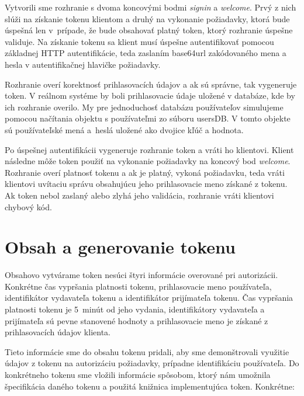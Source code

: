Vytvorili sme rozhranie s dvoma koncovými bodmi \textit{signin} a \textit{welcome}. Prvý z nich slúži na získanie tokenu klientom a druhý na vykonanie požiadavky, ktorá bude úspešná len v~prípade, že bude obsahovať platný token, ktorý rozhranie úspešne validuje. Na získanie tokenu sa klient musí úspešne autentifikovať pomocou základnej HTTP autentifikácie, teda zaslaním base64url \cite{base64_rfc} zakódovaného mena a hesla v autentifikačnej hlavičke požiadavky.

Rozhranie overí korektnosť prihlasovacích údajov a ak sú správne, tak vygeneruje token. V reálnom systéme by boli prihlasovacie údaje uložené v databáze, kde by ich rozhranie overilo. My pre jednoduchosť databázu používateľov simulujeme pomocou načítania objektu s používateľmi zo súboru usersDB. V tomto objekte sú používateľské mená a~heslá uložené ako dvojice kľúč a hodnota.

Po úspešnej autentifikácii vygeneruje rozhranie token a vráti ho klientovi. Klient následne môže token použiť na vykonanie požiadavky na koncový bod \textit{welcome}. Rozhranie overí platnosť tokenu a ak je platný, vykoná požiadavku, teda vráti klientovi uvítaciu správu obsahujúcu jeho prihlasovacie meno získané z tokenu. Ak token nebol zaslaný alebo zlyhá jeho validácia, rozhranie vráti klientovi chybový kód.

\section{Obsah a generovanie tokenu}
\label{sec:obsah}

Obsahovo vytvárame token nesúci štyri informácie overované pri autorizácii. Konkrétne čas vypršania platnosti tokenu, prihlasovacie meno používateľa, identifikátor vydavateľa tokenu a identifikátor prijímateľa tokenu. Čas vypršania platnosti tokenu je 5~minút od jeho vydania, identifikátory vydavateľa a prijímateľa sú pevne stanovené hodnoty a prihlasovacie meno je získané z prihlasovacích údajov klienta.

Tieto informácie sme do obsahu tokenu pridali, aby sme demonštrovali využitie údajov z tokenu na autorizáciu požiadavky, prípadne identifikáciu používateľa. Do konkrétneho tokenu sme vložili informácie spôsobom, ktorý nám umožnila špecifikácia daného tokenu a použitá knižnica implementujúca token. Konkrétne:


